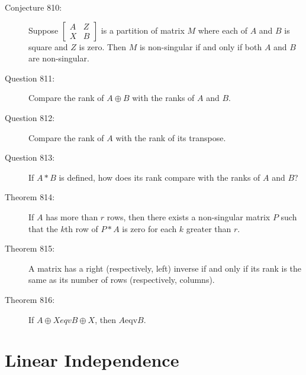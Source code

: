 \documentclass{article}
\begin{document}
\begin{description}
  \item[Conjecture 810:] Suppose 
    $\begin{bmatrix}
      A & Z \\
      X & B
    \end{bmatrix}$ 
    is a partition of matrix $M$ where each of $A$ and $B$ is square and $Z$ is zero. Then $M$ is non-singular if and only if both $A$ and $B$ are non-singular.

  \item[Question 811:] Compare the rank of $A \oplus B$ with the ranks of $A$ and $B$.

  \item[Question 812:] Compare the rank of $A$ with the rank of its transpose.

  \item[Question 813:] If $A*B$ is defined, how does its rank compare with the ranks of $A$ and $B$?

  \item[Theorem 814:] If $A$ has more than $r$ rows, then there exists a non-singular matrix $P$ such that the $k$th row of $P*A$ is zero for each $k$ greater than $r$.

  \item[Theorem 815:] A matrix has a right (respectively, left) inverse if and only if its rank is the same as its number of rows (respectively, columns).

  \item[Theorem 816:] If $A \oplus X eqv B \oplus X$, then $A \text{eqv} B$.

\end{description}

\section{Linear Independence}
\end{document}
